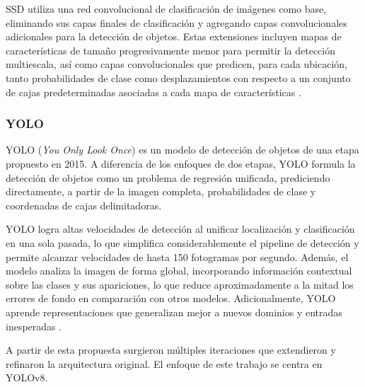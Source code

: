 SSD utiliza una red convolucional de clasificación de imágenes como base, eliminando sus capas finales de 
clasificación y agregando capas convolucionales adicionales para la detección de objetos. Estas extensiones 
incluyen mapas de características de tamaño progresivamente menor para permitir la detección multiescala, 
así como capas convolucionales que predicen, para cada ubicación, tanto probabilidades de clase como 
desplazamientos con respecto a un conjunto de cajas predeterminadas asociadas a cada mapa de 
características \parencite{liu2016ssd}.

\subsubsection{YOLO }
YOLO (\textit{You Only Look Once}) es un modelo de detección de objetos de una etapa propuesto en 2015. 
A diferencia de los enfoques de dos etapas, YOLO formula la detección de objetos como un problema de 
regresión unificada, prediciendo directamente, a partir de la imagen completa, probabilidades de clase 
y coordenadas de cajas delimitadoras.
\medskip

YOLO logra altas velocidades de detección al unificar localización y clasificación en una sola pasada, 
lo que simplifica considerablemente el pipeline de detección y permite alcanzar velocidades de hasta 150 
fotogramas por segundo. Además, el modelo analiza la imagen de forma global, incorporando información 
contextual sobre las clases y sus apariciones, lo que reduce aproximadamente a la mitad los errores de 
fondo en comparación con otros modelos. Adicionalmente, YOLO aprende representaciones que generalizan mejor 
a nuevos dominios y entradas inesperadas \parencite{redmon2016you}.
\medskip

A partir de esta propuesta surgieron múltiples iteraciones que extendieron y refinaron la arquitectura 
original. El enfoque de este trabajo se centra en YOLOv8.


